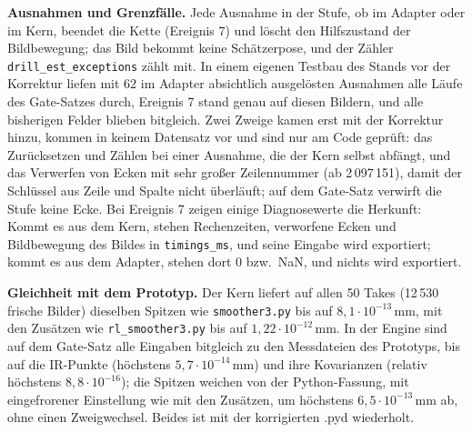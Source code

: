 \documentclass[11pt,a4paper,fleqn]{article}
\newcommand{\code}[1]{\texttt{#1}}
\begin{document}
\textbf{Ausnahmen und Grenzfälle.} Jede Ausnahme in der Stufe, ob im Adapter oder im Kern, beendet die Kette
(Ereignis 7) und löscht den Hilfszustand der Bildbewegung; das Bild bekommt keine Schätzerpose, und der Zähler
\code{drill\_est\_exceptions} zählt mit. In einem eigenen Testbau des Stands vor der Korrektur liefen mit 62 im Adapter absichtlich
ausgelösten Ausnahmen alle Läufe des Gate-Satzes durch, Ereignis 7 stand genau auf diesen Bildern, und alle bisherigen
Felder blieben bitgleich. Zwei Zweige kamen erst mit der Korrektur hinzu, kommen in keinem Datensatz vor und sind nur
am Code geprüft: das Zurücksetzen und Zählen bei einer Ausnahme, die der Kern selbst abfängt, und das Verwerfen von
Ecken mit sehr großer Zeilennummer (ab 2\,097\,151), damit der Schlüssel aus Zeile und Spalte nicht überläuft; auf dem
Gate-Satz verwirft die Stufe keine Ecke. Bei Ereignis 7 zeigen einige Diagnosewerte die Herkunft: Kommt es aus dem
Kern, stehen Rechenzeiten, verworfene Ecken und Bildbewegung des Bildes in \code{timings\_ms}, und seine Eingabe wird
exportiert; kommt es aus dem Adapter, stehen dort 0 bzw.\ NaN, und nichts wird exportiert.

\textbf{Gleichheit mit dem Prototyp.} Der Kern liefert auf allen 50 Takes (12\,530 frische Bilder) dieselben
Spitzen wie \code{smoother3.py} bis auf $8{,}1\cdot10^{-13}$\,mm, mit den Zusätzen wie \code{rl\_smoother3.py} bis
auf $1{,}22\cdot10^{-12}$\,mm. In der Engine sind auf dem Gate-Satz alle Eingaben bitgleich zu den Messdateien des
Prototyps, bis auf die IR-Punkte (höchstens $5{,}7\cdot10^{-14}$\,mm) und ihre Kovarianzen (relativ höchstens
$8{,}8\cdot10^{-16}$); die Spitzen weichen von der Python-Fassung, mit eingefrorener Einstellung wie mit den
Zusätzen, um höchstens $6{,}5\cdot10^{-13}$\,mm ab, ohne einen Zweigwechsel. Beides ist mit der korrigierten .pyd
wiederholt.
\end{document}
